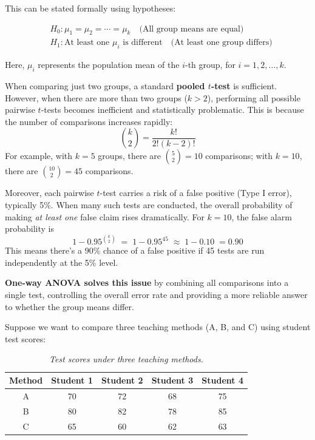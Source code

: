 \documentclass[twoside]{book}
\begin{document}
This can be stated formally using hypotheses:
\begin{textbox}
\begin{align*}
&H_0: \mu_1 = \mu_2 = \cdots = \mu_k \quad \text{(All group means are equal)}\\
&H_1: \text{At least one } \mu_i \text{ is different} \quad \text{(At least one group differs)}
\end{align*}
\end{textbox}
Here, $\mu_i$ represents the population mean of the $i$-th group, for $i = 1, 2, \dots, k$.

When comparing just two groups, a standard \textbf{pooled $t$-test} is sufficient. However, when there are more than two groups ($k > 2$), performing all possible pairwise $t$-tests becomes inefficient and statistically problematic. This is because the number of comparisons increases rapidly:
\[
\binom{k}{2} = \dfrac{k!}{2!(k-2)!}
\]
For example, with \(k = 5\) groups, there are \(\binom{5}{2} = 10\) comparisons; with \(k = 10\), there are \(\binom{10}{2} = 45\) comparisons.

Moreover, each pairwise $t$-test carries a risk of a false positive (Type I error), typically 5\%. When many such tests are conducted, the overall probability of making \textit{at least one} false claim rises dramatically. For $k=10$, the false alarm probability is
\[
1 - 0.95^{\binom{k}{2}} \;=\; 1 - 0.95^{45} \;\approx\; 1 - 0.10 \;= 0.90
\]
This means there's a 90\% chance of a false positive if 45 tests are run independently at the 5\% level.

\textbf{One-way ANOVA solves this issue} by combining all comparisons into a single test, controlling the overall error rate and providing a more reliable answer to whether the group means differ.

\vspace{0.5em}
\noindent
Suppose we want to compare three teaching methods (A, B, and C) using student test scores:

\begin{table}[H]
\centering
\begin{tabular}{c|cccc}
\toprule
Method & Student 1 & Student 2 & Student 3 & Student 4 \\
\midrule
A      & 70        & 72        & 68        & 75        \\
B      & 80        & 82        & 78        & 85        \\
C      & 65        & 60        & 62        & 63        \\
\bottomrule
\end{tabular}
\caption{\textit{Test scores under three teaching methods.}}
\end{table}
\end{document}

